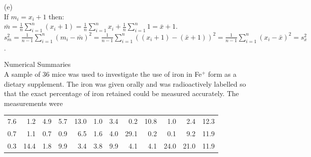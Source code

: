 \documentclass[bigtut]{tutorial}\usepackage[]{graphicx}\usepackage[]{color}
\begin{document}
\begin{tutorial}
\begin{questions}
\begin{solution}
\vspace{.5cm}
(e) \\
If $m_{i} = x_{i} + 1$ then: \\
 $\bar{m} = \frac{1}{n} \sum_{i=1}^{n}  ( x_{i} + 1 ) = \frac{1}{n} \sum_{i=1}^{n}   x_{i} + \frac{1}{n} \sum_{i=1}^{n}  1 = \bar{x} + 1$. \\
$s_{m}^2 = \frac{1}{n-1} \sum_{i=1}^{n}  ( m_{i} -\bar{m} )^2 = \frac{1}{n-1} \sum_{i=1}^{n}  ( (x_{i}+1) -(\bar{x}+1) )^2
= \frac{1}{n-1} \sum_{i=1}^{n}  ( x_{i} -\bar{x} )^2 = s_{x}^2$.

\end{solution}


\vspace{.5cm}
\question Numerical Summaries  \\

A sample of 36 mice was used to investigate the use of iron in Fe$^+$ form as a dietary supplement.  The iron was given orally and was radioactively labelled so that the exact percentage of iron retained could be measured accurately. The measurements were
\begin{center}
\begin{tabular}{rrrrrrrrrrrr}
7.6 & 1.2 & 4.9 &  5.7 & 13.0 & 1.0 &  3.4 &  0.2 & 10.8 &  1.0 &  2.4 & 12.3 \\  
0.7 &  1.1 &  0.7 & 0.9 & 6.5 & 1.6 & 4.0 & 29.1 &  0.2 & 0.1 &  9.2 & 11.9 \\ 
0.3 & 14.4 &  1.8 &  9.9 &  3.4 &  3.8 & 9.9 & 4.1 & 4.1 & 24.0 & 21.0 & 11.9
\end{tabular}
\end{center} 
\vspace{.5cm}
\begin{parts}


\end{parts}
\end{questions}
\end{tutorial}
\end{document}
